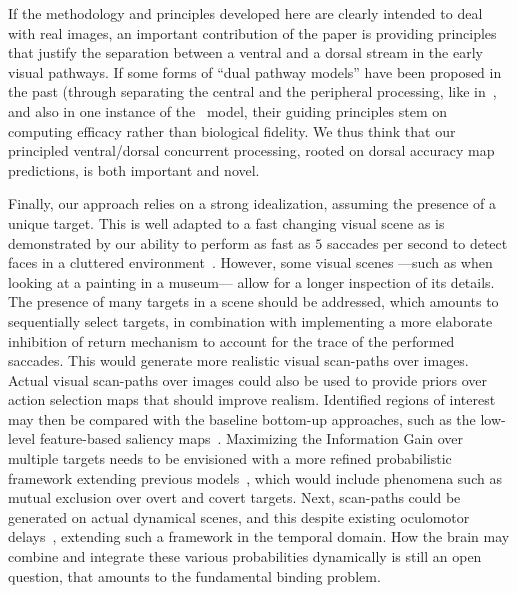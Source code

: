 If the methodology and principles developed here are clearly intended to deal with real images, an important contribution of the paper is providing principles that justify the separation between a ventral and a dorsal stream in the early visual pathways. If some forms of ``dual pathway models'' have been proposed in the past (through separating the central and the peripheral processing, like in~\cite{denil2012learning}, and also in one instance of the~\cite{akbas2017object} model, their guiding principles stem on computing efficacy rather than biological fidelity. We thus think that our principled ventral/dorsal concurrent processing, rooted on dorsal accuracy map predictions, is both important and novel.

Finally, our approach relies on a strong idealization, assuming the presence of a unique target. This is well adapted to a fast changing visual scene as is demonstrated by our ability to perform as fast as $5$ saccades per second to detect faces in a cluttered environment~\cite{Martin18}. However, some visual scenes ---such as when looking at a painting in a museum--- allow for a longer inspection of its details. The presence of many targets in a scene should be addressed, which amounts to sequentially select targets, in combination with implementing a more elaborate inhibition of return mechanism to account for the trace of the performed saccades. This would generate more realistic visual scan-paths over images. Actual visual scan-paths over images could also be used to provide priors over action selection maps that should improve realism. Identified regions of interest may then be compared with the baseline bottom-up approaches, such as the low-level feature-based saliency maps~\cite{Itti01}. Maximizing the Information Gain over multiple targets needs to be envisioned with a more refined probabilistic framework extending previous models~\cite{Friston12}, which would include phenomena such as mutual exclusion over overt and covert targets. Next, scan-paths could be generated on actual dynamical scenes, and this despite existing oculomotor delays~\cite{PerrinetAdamsFriston14}, extending such a framework in the temporal domain. How the brain may combine and integrate these various probabilities dynamically is still an open question, that amounts to the fundamental binding problem.
%

